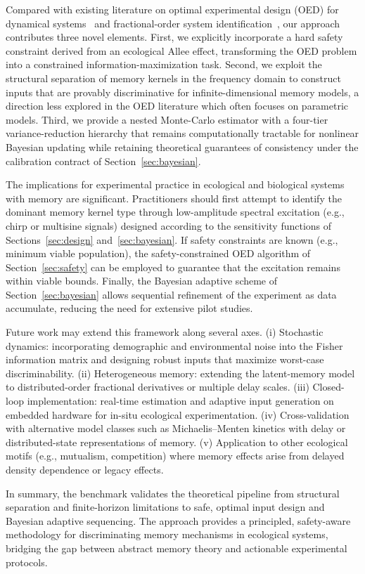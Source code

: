Compared with existing literature on optimal experimental design (OED) for dynamical systems~\citep{baik2020optimal,chaloner1995bayesian} and fractional-order system identification~\citep{deng2007parameter,valerio2011fractional}, our approach contributes three novel elements.  First, we explicitly incorporate a hard safety constraint derived from an ecological Allee effect, transforming the OED problem into a constrained information-maximization task.  Second, we exploit the structural separation of memory kernels in the frequency domain to construct inputs that are provably discriminative for infinite-dimensional memory models, a direction less explored in the OED literature which often focuses on parametric models.  Third, we provide a nested Monte-Carlo estimator with a four-tier variance-reduction hierarchy that remains computationally tractable for nonlinear Bayesian updating while retaining theoretical guarantees of consistency under the calibration contract of Section~\ref{sec:bayesian}.

The implications for experimental practice in ecological and biological systems with memory are significant.  Practitioners should first attempt to identify the dominant memory kernel type through low-amplitude spectral excitation (e.g., chirp or multisine signals) designed according to the sensitivity functions of Sections~\ref{sec:design} and~\ref{sec:bayesian}.  If safety constraints are known (e.g., minimum viable population), the safety-constrained OED algorithm of Section~\ref{sec:safety} can be employed to guarantee that the excitation remains within viable bounds.  Finally, the Bayesian adaptive scheme of Section~\ref{sec:bayesian} allows sequential refinement of the experiment as data accumulate, reducing the need for extensive pilot studies.

Future work may extend this framework along several axes.  (i) Stochastic dynamics: incorporating demographic and environmental noise into the Fisher information matrix and designing robust inputs that maximize worst-case discriminability.  (ii) Heterogeneous memory: extending the latent-memory model to distributed-order fractional derivatives or multiple delay scales.  (iii) Closed-loop implementation: real-time estimation and adaptive input generation on embedded hardware for in-situ ecological experimentation.  (iv) Cross-validation with alternative model classes such as Michaelis--Menten kinetics with delay or distributed-state representations of memory.  (v) Application to other ecological motifs (e.g., mutualism, competition) where memory effects arise from delayed density dependence or legacy effects.

In summary, the benchmark validates the theoretical pipeline from structural separation and finite-horizon limitations to safe, optimal input design and Bayesian adaptive sequencing.  The approach provides a principled, safety-aware methodology for discriminating memory mechanisms in ecological systems, bridging the gap between abstract memory theory and actionable experimental protocols.